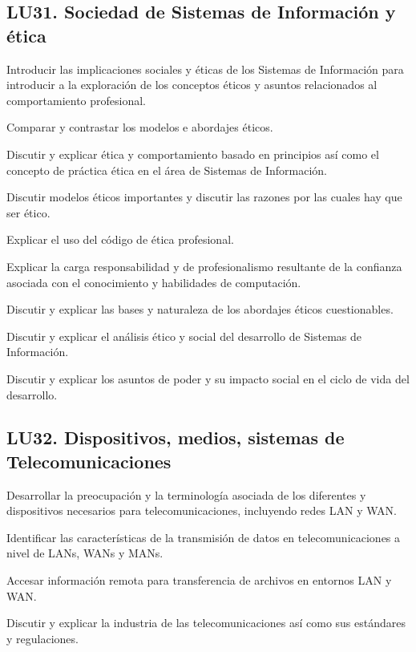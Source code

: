 \subsection{LU31. Sociedad de Sistemas de Información y ética}\label{sec:BOK-LU31}\label{sec:LU31}
\begin{LearningUnit}
\begin{LUGoal}
\item Introducir las implicaciones sociales y éticas de los Sistemas de Información para introducir a la exploración de los conceptos éticos y asuntos relacionados al comportamiento profesional.
\item Comparar y contrastar los modelos e abordajes éticos.
\end{LUGoal}

\begin{LUObjective}
\item Discutir y explicar ética y comportamiento basado en principios así como el concepto de práctica ética en el área de Sistemas de Información.
\item Discutir modelos éticos importantes y discutir las razones por las cuales hay que ser ético.
\item Explicar el uso del código de ética profesional.
\item Explicar la carga responsabilidad y de profesionalismo resultante de la confianza asociada con el conocimiento y habilidades de computación.
\item Discutir y explicar las bases y naturaleza de los abordajes éticos cuestionables.
\item Discutir y explicar el análisis ético y social del desarrollo de Sistemas de Información.
\item Discutir y explicar los asuntos de poder y su impacto social en el ciclo de vida del desarrollo.
\end{LUObjective}
\end{LearningUnit}

\subsection{LU32. Dispositivos, medios, sistemas de Telecomunicaciones}\label{sec:BOK-LU32}\label{sec:LU32}
\begin{LearningUnit}
\begin{LUGoal}
\item Desarrollar la preocupación y la terminología asociada de los diferentes y dispositivos necesarios para telecomunicaciones, incluyendo redes LAN y WAN.
\end{LUGoal}

\begin{LUObjective}
\item Identificar las características de la transmisión de datos en telecomunicaciones a nivel de LANs, WANs y MANs.
\item Accesar información remota para transferencia de archivos en entornos LAN y WAN.
\item Discutir y explicar la industria de las telecomunicaciones así como sus estándares y regulaciones.
\end{LUObjective}
\end{LearningUnit}

